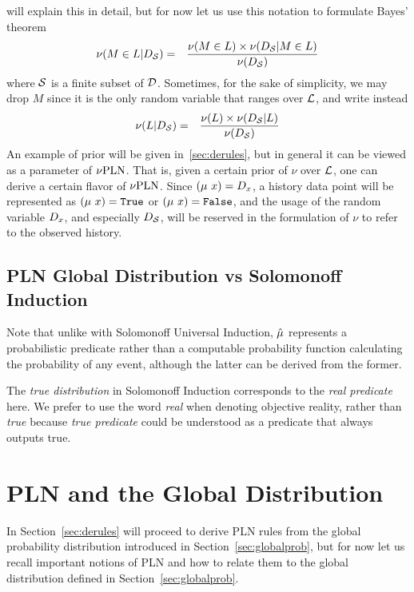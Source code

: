 \documentclass[]{article}
\begin{document}
will explain this in detail, but for now let us use this notation to
formulate Bayes' theorem
\begin{eqnarray}
  \nu(M \in L | D_{\mathcal{S}})
  & = &
  \frac{\nu(M \in L) \times \nu(D_{\mathcal{S}} | M \in L)}{\nu(D_{\mathcal{S}})}
  \label{eq:globaldist}
\end{eqnarray}
where $\mathcal{S}$ is a finite subset of $\mathcal{D}$.  Sometimes, for
the sake of simplicity, we may drop $M$ since it is the only random
variable that ranges over $\mathcal{L}$, and write instead
\begin{eqnarray}
  \nu(L | D_{\mathcal{S}})
  & = &
  \frac{\nu(L) \times \nu(D_{\mathcal{S}} | L)}{\nu(D_{\mathcal{S}})}
\end{eqnarray}
An example of prior will be given in~\ref{sec:derules}, but in general
it can be viewed as a parameter of $\nu\textup{PLN}$.  That is, given a certain
prior of $\nu$ over $\mathcal{L}$, one can derive a certain flavor of
$\nu\textup{PLN}$.  Since $(\mu\ x) = D_{x}$, a history data point will be
represented as $(\mu\ x) = \texttt{True}$ or $(\mu\ x) = \texttt{False}$, and the usage of
the random variable $D_{x}$, and especially $D_{\mathcal{S}}$, will be
reserved in the formulation of $\nu$ to refer to the observed history.

\subsection{PLN Global Distribution vs Solomonoff Induction}
Note that unlike with Solomonoff Universal Induction, $\hat{\mu}$
represents a probabilistic predicate rather than a computable
probability function calculating the probability of any event,
although the latter can be derived from the former.

The \emph{true distribution} in Solomonoff Induction corresponds to
the \emph{real predicate} here.  We prefer to use the word \emph{real}
when denoting objective reality, rather than \emph{true} because
\emph{true predicate} could be understood as a predicate that always
outputs true.

\section{PLN and the Global Distribution}
In Section~\ref{sec:derules} will proceed to derive PLN rules from the
global probability distribution introduced in
Section~\ref{sec:globalprob}, but for now let us recall important
notions of PLN and how to relate them to the global distribution
defined in Section~\ref{sec:globalprob}.
\end{document}
